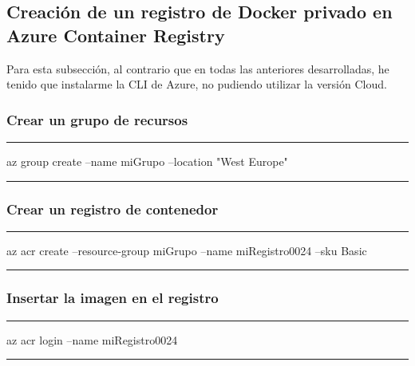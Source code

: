 \documentclass[english,runningheads,a4paper]{llncs}[2018/03/10]
\newenvironment{nscenter}
 {\parskip=0pt\par\nopagebreak\centering}
 {\par\noindent\ignorespacesafterend}
\begin{document}
\subsection*{Creación de un registro de Docker privado en Azure Container Registry}

Para esta subsección, al contrario que en todas las anteriores desarrolladas, he
tenido que instalarme la CLI de Azure, no pudiendo utilizar la versión Cloud.

\subsubsection*{Crear un grupo de recursos}
\begin{nscenter}
\noindent\rule{10cm}{0.4pt}

az group create --name miGrupo --location "West Europe"

\noindent\rule{10cm}{0.4pt}
\end{nscenter}

\subsubsection*{Crear un registro de contenedor}
\begin{nscenter}
\noindent\rule{10cm}{0.4pt}

az acr create --resource-group miGrupo --name miRegistro0024 --sku Basic

\noindent\rule{10cm}{0.4pt}
\end{nscenter}

\subsubsection*{Insertar la imagen en el registro}
\begin{nscenter}


\noindent\rule{10cm}{0.4pt}

az acr login --name miRegistro0024

\noindent\rule{10cm}{0.4pt}
\end{nscenter}
\end{document}
